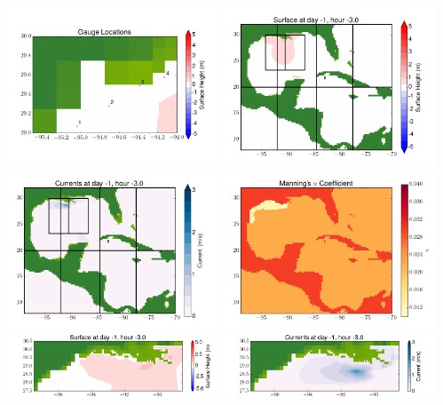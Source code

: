\documentclass[11pt]{article}
\begin{document}
\includegraphics[width=0.475\textwidth]{frame0044fig10.png}
\vskip 10pt 
\includegraphics[width=0.475\textwidth]{frame0045fig1.png}
\includegraphics[width=0.475\textwidth]{frame0045fig2.png}
\vskip 10pt 
\includegraphics[width=0.475\textwidth]{frame0045fig3.png}
\includegraphics[width=0.475\textwidth]{frame0045fig4.png}
\vskip 10pt 
\includegraphics[width=0.475\textwidth]{frame0045fig5.png}
\end{document}
